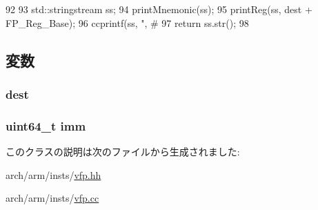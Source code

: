 \begin{DoxyCode}
92 {
93     std::stringstream ss;
94     printMnemonic(ss);
95     printReg(ss, dest + FP_Reg_Base);
96     ccprintf(ss, ", #%
97     return ss.str();
98 }
\end{DoxyCode}


\subsection{変数}
\hypertarget{classArmISA_1_1FpRegImmOp_aec72e8e45bdc87abeeeb75d2a8a9a716}{
\subsubsection[{dest}]{ {\bf dest}}}
\label{classArmISA_1_1FpRegImmOp_aec72e8e45bdc87abeeeb75d2a8a9a716}
\hypertarget{classArmISA_1_1FpRegImmOp_a2b4406ad2843b5aa12d244d01d8fdc69}{
\subsubsection[{imm}]{\setlength{\rightskip}{0pt plus 5cm}uint64\_\-t {\bf imm}}}
\label{classArmISA_1_1FpRegImmOp_a2b4406ad2843b5aa12d244d01d8fdc69}


このクラスの説明は次のファイルから生成されました:\begin{DoxyCompactItemize}
\item 
arch/arm/insts/\hyperlink{vfp_8hh}{vfp.hh}\item 
arch/arm/insts/\hyperlink{vfp_8cc}{vfp.cc}\end{DoxyCompactItemize}
